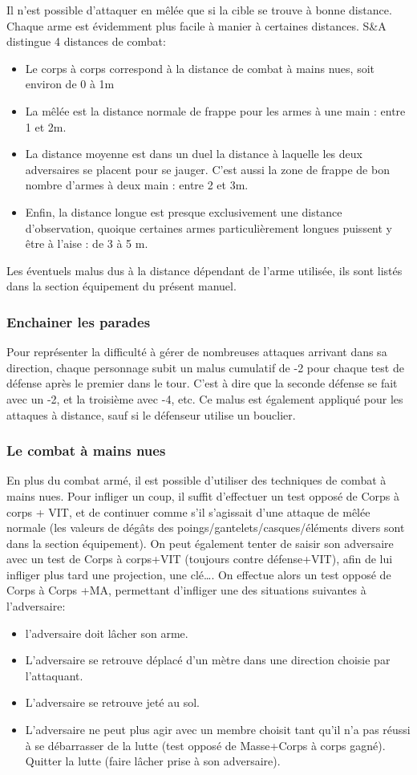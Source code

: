 \documentclass[10pt,a4paper,twocolumn]{book}
\begin{document}
    Il n’est possible d’attaquer en mêlée que si la cible se trouve à bonne distance. Chaque arme est évidemment plus facile à manier à certaines distances. S\&A distingue 4 distances de combat:
    \begin{itemize}
    \item{}Le corps à corps correspond à la distance de combat à mains nues, soit environ de 0 à 1m
\item{}La mêlée est la distance normale de frappe pour les armes à une main : entre 1 et 2m.
\item{}La distance moyenne est dans un duel la distance à laquelle les deux adversaires se placent pour se jauger. C’est aussi la zone de frappe de bon nombre d’armes à deux main : entre 2 et 3m.
\item{}Enfin, la distance longue est presque exclusivement une distance d’observation, quoique certaines armes particulièrement longues puissent y être à l’aise : de 3 à 5 m.
    \end{itemize}

Les éventuels malus dus à la distance dépendant de l’arme utilisée, ils sont listés dans la section équipement du présent manuel.
\subsubsection{Enchainer les parades}
Pour représenter la difficulté à gérer de nombreuses attaques arrivant dans sa direction, chaque personnage subit un malus cumulatif de -2 pour chaque test de défense après le premier dans le tour. C’est à dire que la seconde défense se fait avec un -2, et la troisième avec -4, etc. Ce malus est également appliqué pour les attaques à distance, sauf si le défenseur utilise un bouclier.
\subsubsection{Le combat à mains nues}
En plus du combat armé, il est possible d’utiliser des techniques de combat à mains nues.
Pour infliger un coup, il suffit d’effectuer un test opposé de Corps à corps + VIT, et de continuer comme s’il s’agissait d’une attaque de mêlée normale (les valeurs de dégâts des poings/gantelets/casques/éléments divers sont dans la section équipement).
On peut également tenter de saisir son adversaire avec un test de Corps à corps+VIT (toujours contre défense+VIT), afin de lui infliger plus tard une projection, une clé….
On effectue alors un test opposé de Corps à Corps +MA, permettant d’infliger une des situations suivantes à l’adversaire:
\begin{itemize}
\item{}l’adversaire doit lâcher son arme.
\item{}L’adversaire se retrouve déplacé d’un mètre dans une direction choisie par l’attaquant.
\item{}L’adversaire se retrouve jeté au sol.
\item{}L’adversaire ne peut plus agir avec un membre choisit tant qu’il n’a pas réussi à se débarrasser de la lutte (test opposé de Masse+Corps à corps gagné).
Quitter la lutte (faire lâcher prise à son adversaire).
\end{itemize}
\end{document}
